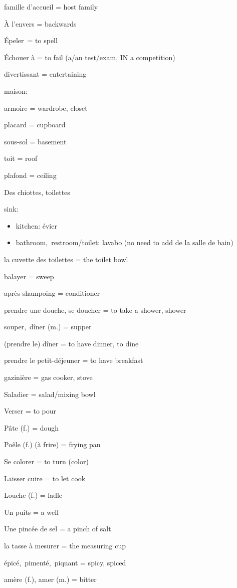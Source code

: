 famille d'accueil = host family

À l'envers = backwards~

Épeler~= to spell~

Échouer à = to fail (a/an test/exam, IN a competition)

divertissant = entertaining

maison:

armoire = wardrobe, closet

placard = cupboard

sous-sol = basement

toit = roof

plafond = ceiling

Des chiottes, toilettes~

sink:

\begin{itemize}
\item
  kitchen: évier~
\item
  bathroom,~restroom/toilet: lavabo (no need to add de la salle de bain)
\end{itemize}

la cuvette des toilettes = the toilet bowl

balayer = sweep

après shampoing = conditioner

prendre une douche, se doucher = to take a shower, shower

souper,~dîner (m.) = supper

(prendre le) dîner = to have dinner, to dine

prendre le petit-déjeuner = to have breakfast

gazinière = gas cooker, stove

Saladier = salad/mixing bowl~

Verser = to pour~

Pâte (f.) = dough

Poêle (f.) (à frire) = frying pan

Se colorer = to turn (color)

Laisser cuire = to let cook

Louche (f.) = ladle~

Un puits = a well

Une pincée de sel = a pinch of salt

la tasse à mesurer = the measuring cup

épicé,~pimenté,~piquant = spicy, spiced

amère (f.), amer (m.) = bitter

